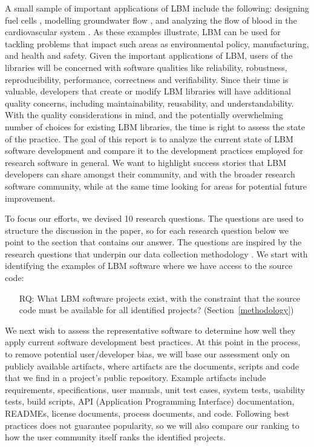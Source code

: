 \documentclass[final, 3p, times, authoryear]{elsarticle}
\newcounter{rqnum} %
\begin{document}
A small sample of important applications of LBM include the following: designing
fuel cells \citep{ZhangEtAl2018}, modelling groundwater flow
\citep{AnwarAndSukop2009}, and analyzing the flow of blood in the cardiovascular
system \citep{SadeghiEtAl2020}.  As these examples illustrate, LBM can be used
for tackling problems that impact such areas as environmental policy,
manufacturing, and health and safety.  Given the important applications of LBM,
users of the libraries will be concerned with software qualities like
reliability, robustness, reproducibility, performance, correctness and
verifiability.  Since their time is valuable, developers that create or modify
LBM libraries will have additional quality concerns, including maintainability,
reusability, and understandability.  With the quality considerations in mind,
and the potentially overwhelming number of choices for existing LBM libraries,
the time is right to assess the state of the practice.  The goal of this report
is to analyze the current state of LBM software development and compare it to
the development practices employed for research software in general.  We want to
highlight success stories that LBM developers can share amongst their community,
and with the broader research software community, while at the same time
looking for areas for potential future improvement.

To focus our efforts, we devised 10 research questions.  The questions are used
to structure the discussion in the paper, so for each research question below we
point to the section that contains our answer.  The questions are inspired by
the research questions that underpin our data collection methodology
\citep{SmithEtAl2021}. We start with identifying the examples of LBM software
where we have access to the source code:

\begin{enumerate}
	\item[RQ\refstepcounter{rqnum}\therqnum \label{RQ_WhatProjects}:] What LBM
	software projects exist, with the constraint that the source code must be
	available for all identified projects? (Section~\ref{methodology})
\end{enumerate}

We next wish to assess the representative software to determine how well they
apply current software development best practices.  At this point in the
process, to remove potential user/developer bias, we will base our assessment
only on publicly available artifacts, where artifacts are the documents, scripts
and code that we find in a project's public repository. Example artifacts
include requirements, specifications, user manuals, unit test cases, system
tests, usability tests, build scripts, API (Application Programming Interface)
documentation, READMEs, license documents, process documents, and code.
Following best practices does not guarantee popularity, so we will also compare
our ranking to how the user community itself ranks the identified projects.
\end{document}
